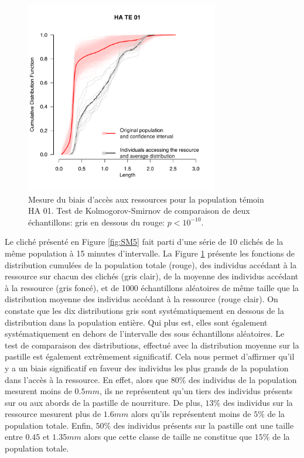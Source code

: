 \begin{figure}[!ht]
\begin{center}
\includegraphics[width=0.75\textwidth]{1_CorpsDeThese/Resumes/Fig/SM06}
\caption[Mesure du biais
d'accès aux ressources]{Mesure du biais
d'accès aux ressources pour la population témoin HA 01. Test de
Kolmogorov-Smirnov de comparaison de deux échantillons: gris en dessous du
rouge: $p<10^{-10}$.}
\label{fig:SM6}
\end{center}
\end{figure}

Le cliché présenté en Figure \ref{fig:SM5} fait parti d'une série de 10 clichés
de la même population à 15 minutes d'intervalle. La Figure \ref{fig:SM6}
présente les fonctions de distribution cumulées de la population totale (rouge),
des individus accédant à la ressource sur chacun des clichés (gris clair), de la
moyenne des individus accédant à la ressource (gris foncé), et de 1000
échantillons aléatoires de même taille que la distribution moyenne des individus
accédant à la ressource (rouge clair). On constate que les dix distributions
gris sont systématiquement en dessous de la distribution dans la population entière. Qui
plus est, elles sont également systématiquement en dehors de l'intervalle des
sous échantillons aléatoires. Le test de comparaison des distributions,
effectué avec la distribution moyenne sur la pastille est également extrêmement
significatif.
Cela nous permet d'affirmer qu'il y a un biais significatif en faveur des
individus les plus grands de la population dans l'accès à la ressource. En
effet, alors que $80\%$ des individus de la population mesurent moins de
$0.5mm$, ils ne représentent qu'un tiers des individus présents sur ou aux
abords de la pastille de nourriture. De plus, $13\%$ des individus sur la
ressource mesurent plus de $1.6mm$ alors qu'ils représentent moins de $5\%$ de
la population totale. Enfin, $50\%$ des individus présents sur la pastille ont
une taille entre $0.45$ et $1.35mm$ alors que cette classe de taille ne
constitue que $15\%$ de la population totale.

